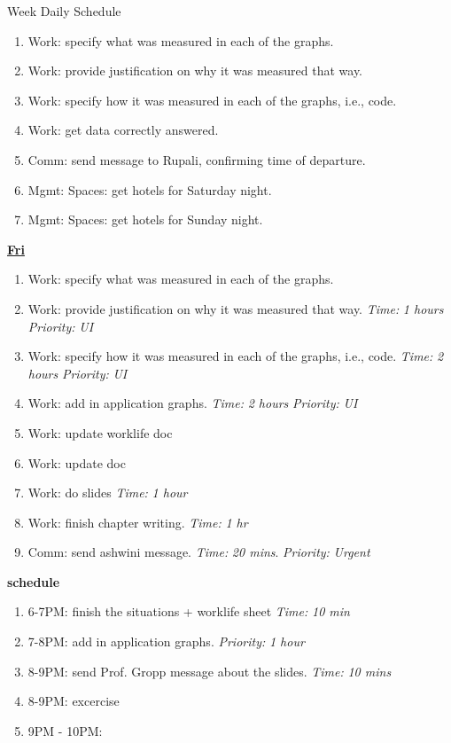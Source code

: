 \documentclass[serif, mathserif, final]{beamer}
\newcommand{\timeEst}[1]{\textit{Time:} \textit{#1}}
\newcommand{\priority}[1]{\textit{Priority:} \textit{#1}}
\begin{document}
\begin{frame}{}
\begin{columns}
\begin{column}{0.50\linewidth}
\begin{block}{Week Daily Schedule}
\begin{enumerate}
  \item \tiny Work: specify what was measured in each of the graphs. 
  \item \tiny Work: provide justification on why it was measured that way. 
  \item \tiny Work: specify how it was measured in each of the graphs, i.e., code. 
  \item \tiny Work: get data correctly answered. 
  \item \tiny Comm: send message to Rupali, confirming time of
    departure. 
  \item \tiny Mgmt: Spaces: get hotels for Saturday night.  
  \item \tiny Mgmt: Spaces: get hotels for Sunday night.  
  \end{enumerate}
  
  \textbf{\small {\underline{Fri}}} 
  \begin{enumerate} 

  \tiny \item \tiny Work: specify what was measured in each of the graphs. 
  \item \tiny Work: provide justification on why it was measured that way. \timeEst{1 hours} \priority{UI} 
  \item \tiny Work: specify how it was measured in each of the graphs, i.e., code. \timeEst{2 hours} \priority{UI} 

  \item \tiny Work: add in application graphs.  \timeEst{2 hours} \priority{UI} 

\item \tiny Work: update worklife doc 
\item \tiny Work: update doc 

  \item \tiny Work: do slides \timeEst{1 hour}
  \item \tiny Work: finish chapter writing. \timeEst{1 hr} 
  \item \tiny Comm: send ashwini message. \timeEst{20 mins}. \priority{Urgent} 
  \end{enumerate} 

\textbf{schedule} 
\begin{enumerate} 
\tiny \item \tiny 6-7PM: finish the situations + worklife sheet \timeEst{10 min} 
\item \tiny 7-8PM: add in application graphs. \priority{1 hour} 
\item \tiny 8-9PM: send Prof. Gropp message about the slides. \timeEst{10 mins} 
\item \tiny 8-9PM: excercise 
\item \tiny 9PM - 10PM: 
\end{enumerate}   


\end{block}
\end{column}
\end{columns}
\end{frame}
\end{document}
